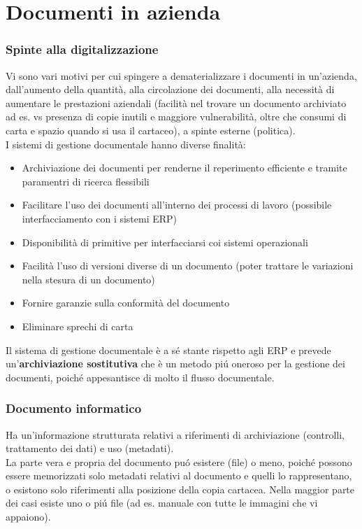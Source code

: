 \chapter{Documenti in azienda}

\subsection{Spinte alla digitalizzazione}
Vi sono vari motivi per cui spingere a dematerializzare i documenti in
un'azienda, dall'aumento della quantit\`a, alla circolazione dei
documenti, alla necessit\`a di aumentare le prestazioni aziendali
(facilit\`a nel trovare un documento archiviato ad es. vs presenza di
copie inutili e maggiore vulnerabilit\`a, oltre che consumi di carta e
spazio quando si usa il cartaceo), a spinte esterne (politica).\\
I sistemi di gestione documentale hanno diverse finalit\`a:

\begin{itemize}
	
	\item
	Archiviazione dei documenti per renderne il reperimento efficiente e tramite 
	paramentri di ricerca flessibili
	\item 
	Facilitare l'uso dei documenti all'interno dei processi di lavoro (possibile
	interfacciamento con i sistemi ERP)
	\item
	Disponibilit\`a di primitive per interfacciarsi coi sistemi operazionali
	\item
	Facilit\`a l'uso di versioni diverse di un documento (poter trattare le
	variazioni nella stesura di un documento)
	\item
	Fornire garanzie sulla conformit\`a del documento
	\item
	Eliminare sprechi di carta
\end{itemize}

Il sistema di gestione documentale \`e a s\'e stante rispetto agli ERP e
prevede un'\textbf{archiviazione sostitutiva} che \`e un metodo pi\'u oneroso 
per la gestione dei documenti, poich\'e appesantisce di molto il flusso
documentale.

\subsection{Documento informatico}

Ha un'informazione strutturata relativi a riferimenti di archiviazione
(controlli, trattamento dei dati) e uso (metadati).\\
La parte vera e propria del documento pu\'o esistere (file) o meno, poich\'e
possono essere memorizzati solo metadati relativi al documento e quelli
lo rappresentano, o esistono solo riferimenti alla posizione della copia
cartacea. Nella maggior parte dei casi esiste uno o pi\'u file (ad es.
manuale con tutte le immagini che vi appaiono).

